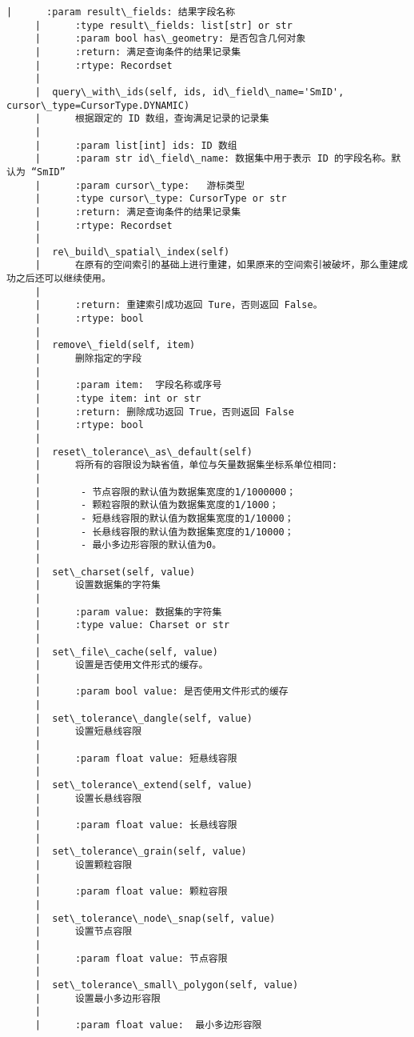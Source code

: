 \documentclass[11pt]{article}
\begin{document}
\begin{Verbatim}[commandchars=\\\{\}]
     |      :param result\_fields: 结果字段名称
     |      :type result\_fields: list[str] or str
     |      :param bool has\_geometry: 是否包含几何对象
     |      :return: 满足查询条件的结果记录集
     |      :rtype: Recordset
     |  
     |  query\_with\_ids(self, ids, id\_field\_name='SmID', cursor\_type=CursorType.DYNAMIC)
     |      根据跟定的 ID 数组，查询满足记录的记录集
     |      
     |      :param list[int] ids: ID 数组
     |      :param str id\_field\_name: 数据集中用于表示 ID 的字段名称。默认为 “SmID”
     |      :param cursor\_type:   游标类型
     |      :type cursor\_type: CursorType or str
     |      :return: 满足查询条件的结果记录集
     |      :rtype: Recordset
     |  
     |  re\_build\_spatial\_index(self)
     |      在原有的空间索引的基础上进行重建，如果原来的空间索引被破坏，那么重建成功之后还可以继续使用。
     |      
     |      :return: 重建索引成功返回 Ture，否则返回 False。
     |      :rtype: bool
     |  
     |  remove\_field(self, item)
     |      删除指定的字段
     |      
     |      :param item:  字段名称或序号
     |      :type item: int or str
     |      :return: 删除成功返回 True，否则返回 False
     |      :rtype: bool
     |  
     |  reset\_tolerance\_as\_default(self)
     |      将所有的容限设为缺省值，单位与矢量数据集坐标系单位相同:
     |      
     |       - 节点容限的默认值为数据集宽度的1/1000000；
     |       - 颗粒容限的默认值为数据集宽度的1/1000；
     |       - 短悬线容限的默认值为数据集宽度的1/10000；
     |       - 长悬线容限的默认值为数据集宽度的1/10000；
     |       - 最小多边形容限的默认值为0。
     |  
     |  set\_charset(self, value)
     |      设置数据集的字符集
     |      
     |      :param value: 数据集的字符集
     |      :type value: Charset or str
     |  
     |  set\_file\_cache(self, value)
     |      设置是否使用文件形式的缓存。
     |      
     |      :param bool value: 是否使用文件形式的缓存
     |  
     |  set\_tolerance\_dangle(self, value)
     |      设置短悬线容限
     |      
     |      :param float value: 短悬线容限
     |  
     |  set\_tolerance\_extend(self, value)
     |      设置长悬线容限
     |      
     |      :param float value: 长悬线容限
     |  
     |  set\_tolerance\_grain(self, value)
     |      设置颗粒容限
     |      
     |      :param float value: 颗粒容限
     |  
     |  set\_tolerance\_node\_snap(self, value)
     |      设置节点容限
     |      
     |      :param float value: 节点容限
     |  
     |  set\_tolerance\_small\_polygon(self, value)
     |      设置最小多边形容限
     |      
     |      :param float value:  最小多边形容限

\end{Verbatim}
\end{document}
